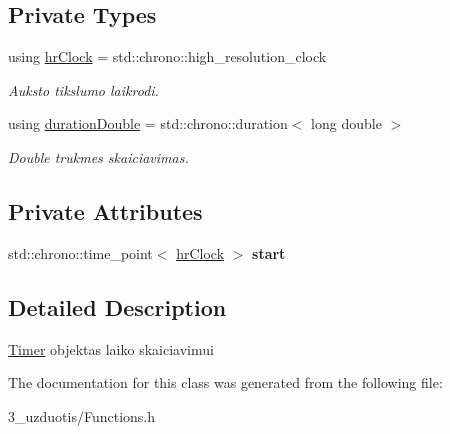 \subsection*{Private Types}
\begin{DoxyCompactItemize}
\item 
\mbox{\label{class_timer_a5e72191005a6b2238ed91c3839374093}} 
using \mbox{\hyperlink{class_timer_a5e72191005a6b2238ed91c3839374093}{hr\+Clock}} = std\+::chrono\+::high\+\_\+resolution\+\_\+clock
\begin{DoxyCompactList}\small\item\em Auksto tikslumo laikrodi. \end{DoxyCompactList}\item 
\mbox{\label{class_timer_ad818a6ed2beb8b496d99bc31908fa6d6}} 
using \mbox{\hyperlink{class_timer_ad818a6ed2beb8b496d99bc31908fa6d6}{duration\+Double}} = std\+::chrono\+::duration$<$ long double $>$
\begin{DoxyCompactList}\small\item\em Double trukmes skaiciavimas. \end{DoxyCompactList}\end{DoxyCompactItemize}
\subsection*{Private Attributes}
\begin{DoxyCompactItemize}
\item 
\mbox{\label{class_timer_ad3c6240154d9bcccb88b701849919822}} 
std\+::chrono\+::time\+\_\+point$<$ \mbox{\hyperlink{class_timer_a5e72191005a6b2238ed91c3839374093}{hr\+Clock}} $>$ {\bfseries start}
\end{DoxyCompactItemize}


\subsection{Detailed Description}
\mbox{\hyperlink{class_timer}{Timer}} objektas laiko skaiciavimui 

The documentation for this class was generated from the following file\+:\begin{DoxyCompactItemize}
\item 
3\+\_\+uzduotis/Functions.\+h\end{DoxyCompactItemize}

